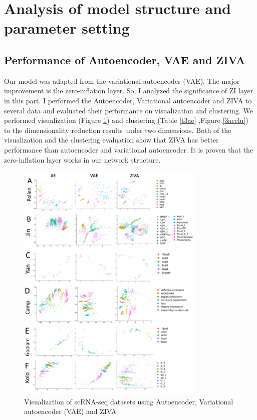 \section{Analysis of model structure and parameter setting}
\subsection{Performance of Autoencoder, VAE and ZIVA}
Our model was adapted from the variational autoencoder (VAE). The major improvement is the zero-inflation layer. So, I analyzed the significance of ZI layer in this part. I performed the Autoencoder, Variational autoencoder and ZIVA to several data and evaluated their performance on visualization and clustering. We performed visualization (Figure \ref{3ae}) and clustering (Table \ref{t3ae} ,Figure \ref{3aeclu}) to the dimensionality reduction results under two dimensions. Both of the visualization and the clustering evaluation show that ZIVA has better performance than autoencoder and variational autoencoder. It is proven that the zero-inflation layer works in our network structure. \\
\begin{figure}[htb!]
    \centering
    \includegraphics[width=0.8\textwidth]{figures/myfigures/3ae.png}
    \caption{Visualization of scRNA-seq datasets using Autoencoder, Variational autoencoder (VAE) and ZIVA}
    \label{3ae}
\end{figure}
